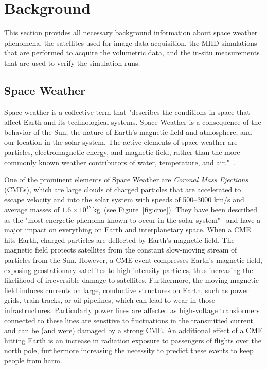 \documentclass[journal]{vgtc}                %
\begin{document}
\section{Background}
This section provides all necessary background information about space weather phenomena, the satellites used for image data acquisition, the MHD simulations that are performed to acquire the volumetric data, and the in-situ measurements that are used to verify the simulation runs.

\subsection{Space Weather}
Space weather is a collective term that "describes the conditions in space that affect Earth and its technological systems. Space Weather is a consequence of the behavior of the Sun, the nature of Earth’s magnetic field and atmosphere, and our location in the solar system. The active elements of space weather are particles, electromagnetic energy, and magnetic field, rather than the more commonly known weather contributors of water, temperature, and air."~\cite{noaaprofile}.

One of the prominent elements of Space Weather are \emph{Coronal Mass Ejections} (CMEs), which are large clouds of charged particles that are accelerated to escape velocity and into the solar system with speeds of 500--3000 km/s and average masses of $1.6 \times 10^{12}$\,kg~(see Figure~\ref{fig:cme}). They have been described as the "most energetic phenoma known to occur in the solar system"~\cite{Kahler:1987jt} and have a major impact on everything on Earth and interplanetary space. When a CME hits Earth, charged particles are deflected by Earth's magnetic field. The magnetic field protects satellites from the constant slow-moving stream of particles from the Sun. However, a CME-event compresses Earth's magnetic field, exposing geostationary satellites to high-intensity particles, thus increasing the likelihood of irreversible damage to satellites. Furthermore, the moving magnetic field induces currents on large, conductive structures on Earth, such as power grids, train tracks, or oil pipelines, which can lead to wear in those infrastructures. Particularly power lines are affected as high-voltage transformers connected to these lines are sensitive to fluctuations in the transmitted current and can be (and were) damaged by a strong CME. An additional effect of a CME hitting Earth is an increase in radiation exposure to passengers of flights over the north pole, furthermore increasing the necessity to predict these events to keep people from harm.
\end{document}

